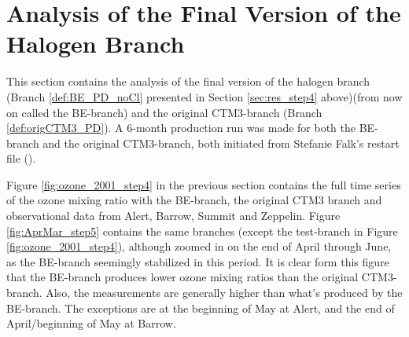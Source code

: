 









\clearpage

\section{Analysis of the Final Version of the Halogen Branch}\label{sec:res_final_Version}

This section contains the analysis of the final version of the halogen branch (Branch \ref{def:BE_PD_noCl} presented in Section \ref{sec:res_step4} above)(from now on called the BE-branch) and the original CTM3-branch (Branch \ref{def:origCTM3_PD}). A 6-month production run was made for both the BE-branch and the original CTM3-branch, both initiated from Stefanie Falk's restart file (\cite{StefaniePersonal}). 

\medskip

Figure \ref{fig:ozone_2001_step4} in the previous section contains the full time series of the ozone mixing ratio with the BE-branch, the original CTM3 branch and observational data from Alert, Barrow, Summit and Zeppelin. Figure \ref{fig:AprMar_step5} contains the same branches (except the test-branch in Figure \ref{fig:ozone_2001_step4}), although zoomed in on the end of April through June, as the BE-branch seemingly stabilized in this period. It is clear form this figure that the BE-branch produces lower ozone mixing ratios than the original CTM3-branch. Also, the measurements are generally higher than what's produced by the BE-branch. The exceptions are at the beginning of May at Alert,  and the end of April/beginning of May at Barrow.

